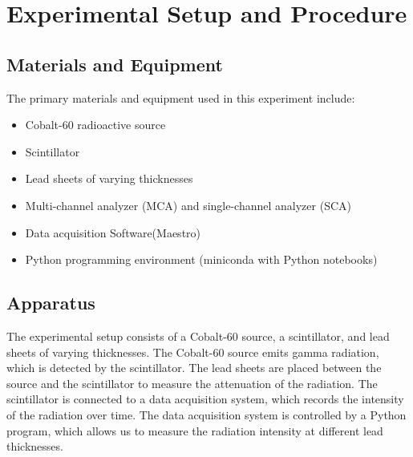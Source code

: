 \documentclass[12pt]{article}
\begin{document}
    \section{Experimental Setup and Procedure}
        \subsection{Materials and Equipment}
            The primary materials and equipment used in this experiment include:
            \begin{itemize}
                \item Cobalt-60 radioactive source
                \item Scintillator
                \item Lead sheets of varying thicknesses
                \item Multi-channel analyzer (MCA) and single-channel analyzer (SCA)
                \item Data acquisition Software(Maestro)
                \item Python programming environment (miniconda with Python notebooks)
            \end{itemize}
            
        \subsection{Apparatus}
            The experimental setup consists of a Cobalt-60 source, a scintillator, and lead sheets of varying thicknesses. 
            The Cobalt-60 source emits gamma radiation, which is detected by the scintillator. 
            The lead sheets are placed between the source and the scintillator to measure the attenuation of the radiation. 
            The scintillator is connected to a data acquisition system, which records the intensity of the radiation over time. 
            The data acquisition system is controlled by a Python program, which allows us to measure the radiation intensity at different lead thicknesses.
            
\end{document}
